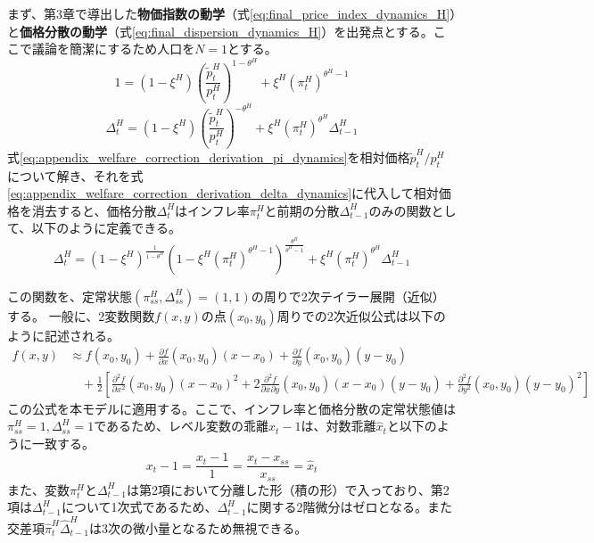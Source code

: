 まず、第3章で導出した\textbf{物価指数の動学}（式\ref{eq:final_price_index_dynamics_H}）と\textbf{価格分散の動学}（式\ref{eq:final_dispersion_dynamics_H}）を出発点とする。ここで議論を簡潔にするため人口を\(N=1\)とする。
\begin{equation}
    1=(1-\xi^H)\left(\frac{\widetilde{p}_t^H}{p_t^H}\right)^{1-\theta^H}+\xi^H(\pi_t^H)^{\theta^H-1}
\label{eq:appendix_welfare_correction_derivation_pi_dynamics}
\end{equation}
\begin{equation}
    \Delta_t^H=(1-\xi^H)\left(\frac{\widetilde{p}_t^H}{p_t^H}\right)^{-\theta^H}+\xi^H(\pi_t^H)^{\theta^H}\Delta_{t-1}^H
\label{eq:appendix_welfare_correction_derivation_delta_dynamics}
\end{equation}
式\eqref{eq:appendix_welfare_correction_derivation_pi_dynamics}を相対価格\(\widetilde{p}_t^H/p_t^H\)について解き、それを式\eqref{eq:appendix_welfare_correction_derivation_delta_dynamics}に代入して相対価格を消去すると、価格分散\(\Delta_t^H\)はインフレ率\(\pi_t^H\)と前期の分散\(\Delta_{t-1}^H\)のみの関数として、以下のように定義できる。
\begin{equation}
    \Delta_t^H=(1-\xi^H)^{\frac{1}{1-\theta^H}}\left(1-\xi^H(\pi_t^H)^{\theta^H-1}\right)^{\frac{\theta^H}{\theta^H-1}}+\xi^H(\pi_t^H)^{\theta^H}\Delta_{t-1}^H
\label{eq:appendix_welfare_correction_derivation_delta_combined}
\end{equation}

この関数を、定常状態\((\pi_{ss}^H,\Delta_{ss}^H)=(1,1)\)の周りで2次テイラー展開（近似）する。
一般に、2変数関数\(f(x,y)\)の点\((x_0,y_0)\)周りでの2次近似公式は以下のように記述される。
\begin{align}
    f(x,y)&\approx f(x_0,y_0)+\frac{\partial f}{\partial x}(x_0,y_0)(x-x_0)+\frac{\partial f}{\partial y}(x_0,y_0)(y-y_0) \label{eq:appendix_welfare_correction_derivation_2nd_taylor_step1} \\
    &\quad+\frac{1}{2}\left[\frac{\partial^2 f}{\partial x^2}(x_0,y_0)(x-x_0)^2+2\frac{\partial^2 f}{\partial x\partial y}(x_0,y_0)(x-x_0)(y-y_0)+\frac{\partial^2 f}{\partial y^2}(x_0,y_0)(y-y_0)^2\right]
\label{eq:appendix_welfare_correction_derivation_2nd_taylor}
\end{align}
この公式を本モデルに適用する。ここで、インフレ率と価格分散の定常状態値は\(\pi_{ss}^H=1,\Delta_{ss}^H=1\)であるため、レベル変数の乖離\(x_t-1\)は、対数乖離\(\hat{x}_t\)と以下のように一致する。
\begin{equation}
    x_t-1=\frac{x_t-1}{1}=\frac{x_t-x_{ss}}{x_{ss}}=\hat{x}_t
\label{eq:appendix_welfare_correction_derivation_hat_identity}
\end{equation}
また、変数\(\pi_t^H\)と\(\Delta_{t-1}^H\)は第2項において分離した形（積の形）で入っており、第2項は\(\Delta_{t-1}^H\)について1次式であるため、\(\Delta_{t-1}^H\)に関する2階微分はゼロとなる。また交差項\(\hat{\pi}_t^H\hat{\Delta}_{t-1}^H\)は3次の微小量となるため無視できる。

